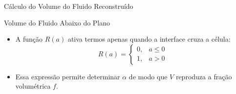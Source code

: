 \documentclass[../main/main.tex]{subfiles}
\begin{document}
\begin{frame}{Cálculo do Volume do Fluido Reconstruído}
  \small
  \vspace{-2cm}
  \begin{block}{Volume do Fluido Abaixo do Plano}
    {}
  \end{block}

  \begin{itemize}
    \scriptsize
    \item A função \(R(a)\) ativa termos apenas quando a interface cruza a célula:
    \[
    R(a) = \begin{cases}
    0, & a \le 0\\
    1, & a > 0
    \end{cases}
    \]
    \item Essa expressão permite determinar \(\alpha\) de modo que \(V\) reproduza a fração volumétrica \(f\).
  \end{itemize}

\end{frame}
\end{document}
